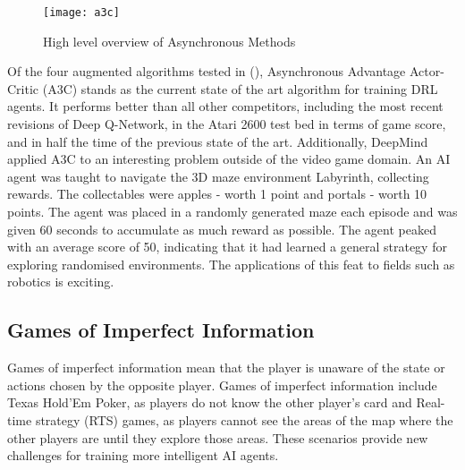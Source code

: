 \begin{figure}[H]
    \centering
    \texttt{[image: a3c]}
    \caption{High level overview of Asynchronous Methods}
\end{figure}

Of the four augmented algorithms tested in (\citet{a3c}), Asynchronous Advantage Actor-Critic (A3C) stands as the current state of the art algorithm for training DRL agents. It performs better than all other competitors, including the most recent revisions of Deep Q-Network, in the Atari 2600 test bed in terms of game score, and in half the time of the previous state of the art. Additionally, DeepMind applied A3C to an interesting problem outside of the video game domain. An AI agent was taught to navigate the 3D maze environment Labyrinth, collecting rewards. The collectables were apples - worth 1 point and portals - worth 10 points. The agent was placed in a randomly generated maze each episode and was given 60 seconds to accumulate as much reward as possible. The agent peaked with an average score of 50, indicating that it had learned a general strategy for exploring randomised environments. The applications of this feat to fields such as robotics is exciting.

\subsection{Games of Imperfect Information}
Games of imperfect information mean that the player is unaware of the state or actions chosen by the opposite player. Games of imperfect information include Texas Hold'Em Poker, as players do not know the other player's card and Real-time strategy (RTS) games, as players cannot see the areas of the map where the other players are until they explore those areas. These scenarios provide new challenges for training more intelligent AI agents.

